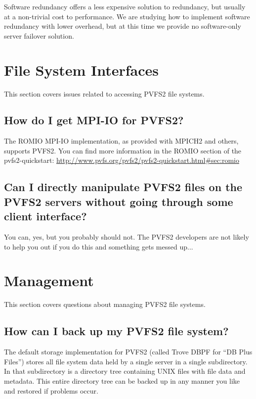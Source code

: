 \documentclass[11pt,letterpaper]{article}
\begin{document}
Software redundancy offers a less expensive solution to redundancy,
but usually at a non-trivial cost to performance.  We are studying how
to implement software redundancy with lower overhead, but at this time
we provide no software-only server failover solution.

%
%
\section{File System Interfaces}

This section covers issues related to accessing PVFS2 file systems.

\subsection{How do I get MPI-IO for PVFS2?}

The ROMIO MPI-IO implementation, as provided with MPICH2 and others, supports
PVFS2.  You can find more information in the ROMIO section of the
pvfs2-quickstart: \url{http://www.pvfs.org/pvfs2/pvfs2-quickstart.html\#sec:romio}

\subsection{Can I directly manipulate PVFS2 files on the PVFS2 servers
            without going through some client interface?}

You can, yes, but you probably should not.  The PVFS2 developers are not
likely to help you out if you do this and something gets messed up...

%
%
\section{Management}

This section covers questions about managing PVFS2 file systems.

\subsection{How can I back up my PVFS2 file system?}

The default storage implementation for PVFS2 (called Trove DBPF for ``DB Plus
Files'') stores all file system data held by a single server in a single
subdirectory.  In that subdirectory is a directory tree containing UNIX files
with file data and metadata.
%
This entire directory tree can be backed up in any manner you like and
restored if problems occur.
\end{document}
